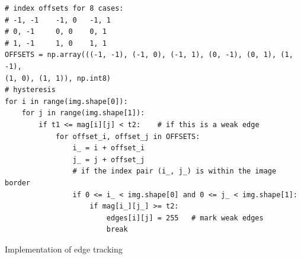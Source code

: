\documentclass{ee208report}
\begin{document}
\begin{listing}
    \begin{verbatim}
# index offsets for 8 cases:
# -1, -1    -1, 0   -1, 1
# 0, -1     0, 0    0, 1
# 1, -1     1, 0    1, 1
OFFSETS = np.array(((-1, -1), (-1, 0), (-1, 1), (0, -1), (0, 1), (1, -1),
(1, 0), (1, 1)), np.int8)
# hysteresis
for i in range(img.shape[0]):
    for j in range(img.shape[1]):
        if t1 <= mag[i][j] < t2:    # if this is a weak edge
            for offset_i, offset_j in OFFSETS:
                i_ = i + offset_i
                j_ = j + offset_j
                # if the index pair (i_, j_) is within the image border
                if 0 <= i_ < img.shape[0] and 0 <= j_ < img.shape[1]:
                    if mag[i_][j_] >= t2:
                        edges[i][j] = 255   # mark weak edges
                        break
    \end{verbatim}
    \caption{Implementation of edge tracking}
    \label{lst:edge-tracking}
\end{listing}
\end{document}
